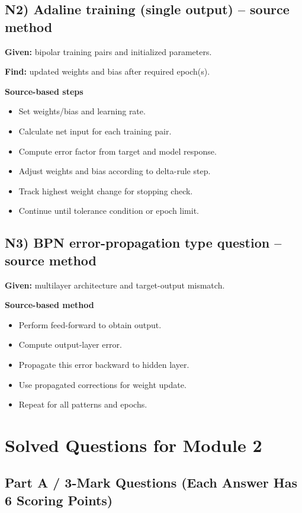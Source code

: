 \documentclass[11pt,a4paper]{article}
\begin{document}
\subsection*{N2) Adaline training (single output) -- source method}
\textbf{Given:} bipolar training pairs and initialized parameters.

\textbf{Find:} updated weights and bias after required epoch(s).

\textbf{Source-based steps}
\begin{itemize}
\item Set weights/bias and learning rate.
\item Calculate net input for each training pair.
\item Compute error factor from target and model response.
\item Adjust weights and bias according to delta-rule step.
\item Track highest weight change for stopping check.
\item Continue until tolerance condition or epoch limit.
\end{itemize}

\subsection*{N3) BPN error-propagation type question -- source method}
\textbf{Given:} multilayer architecture and target-output mismatch.

\textbf{Source-based method}
\begin{itemize}
\item Perform feed-forward to obtain output.
\item Compute output-layer error.
\item Propagate this error backward to hidden layer.
\item Use propagated corrections for weight update.
\item Repeat for all patterns and epochs.
\end{itemize}

\section*{Solved Questions for Module 2}

\subsection*{Part A / 3-Mark Questions (Each Answer Has 6 Scoring Points)}
\end{document}
